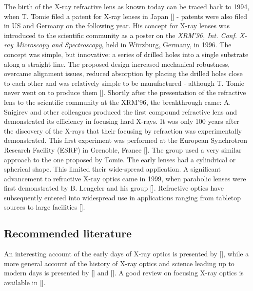 \begin{refsection}
The birth of the X-ray refractive lens as known today can be traced back to 1994, when T. Tomie filed a patent for X-ray lenses in Japan [\cite{Tomie1994}] - patents were also filed in US and Germany on the following year. His concept for X-ray lenses was introduced to the scientific community as a poster on the \textit{XRM'96, Int. Conf. X-ray Microscopy and Spectroscopy}, held in W\"urzburg, Germany, in 1996. The concept was simple, but innovative: a series of drilled holes into a single substrate along a straight line. The proposed design increased mechanical robustness, overcame alignment issues, reduced absorption by placing the drilled holes close to each other and was relatively simple to be manufactured - although T. Tomie never went on to produce them [\cite{Tomie2010}]. Shortly after the presentation of the refractive lens to the scientific community at the XRM'96, the breakthrough came: A. Snigirev and other colleagues produced the first compound refractive lens and demonstrated its efficiency in focusing hard X-rays. It was only 100 years after the discovery of the X-rays that their focusing by refraction was experimentally demonstrated. This first experiment was performed at the European Synchrotron Research Facility (ESRF) in  Grenoble, France [\cite{Snigirev1996}]. The group used a very similar approach to the one proposed by Tomie. The early lenses had a cylindrical or spherical shape. This limited their wide-spread application. A significant advancement to refractive X-ray optics came in 1999, when parabolic lenses were first demonstrated by B. Lengeler and his group [\cite{Lengeler1999,Lengeler2001}]. Refractive optics have subsequently entered into widespread use in applications ranging from tabletop sources to large facilities [\cite{Snigirev2008}].

\subsection*{Recommended literature}

An interesting account of the early days of X-ray optics is presented by [\cite{Compton1928, Compton1931}], while a more general account of the history of X-ray optics and science leading up to modern days is presented by [\cite[\textit{§1}]{Willmott2019}] and [\cite[\textit{§2}]{Jacobsen2019}]. A good review on focusing X-ray optics is available in [\cite{Ice2011,Macrander2017}].


\end{refsection}

